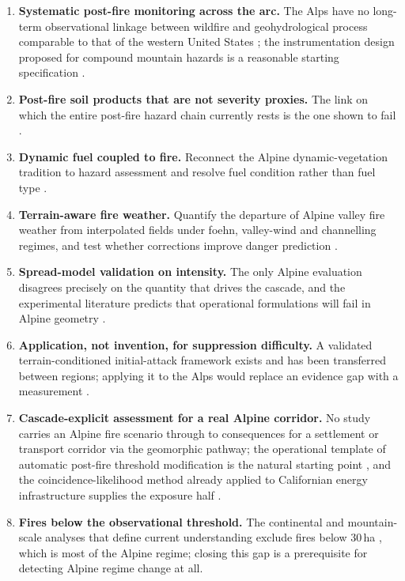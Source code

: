 \documentclass[11pt,a4paper]{article}
\begin{document}
\begin{enumerate}
    \item \textbf{Systematic post-fire monitoring across the arc.} The Alps have no long-term observational linkage between wildfire and geohydrological process comparable to that of the western United States \citep{melzner_wildfire-induced_2025}; the instrumentation design proposed for compound mountain hazards is a reasonable starting specification \citep{baselt_compound_2026}.
    \item \textbf{Post-fire soil products that are not severity proxies.} The link on which the entire post-fire hazard chain currently rests is the one shown to fail \citep{negri_wildfire_2026}.
    \item \textbf{Dynamic fuel coupled to fire.} Reconnect the Alpine dynamic-vegetation tradition to hazard assessment and resolve fuel condition rather than fuel type \citep{schumacher_relative_2006, hillebrand_contrasting_2023, muller_towards_2020}.
    \item \textbf{Terrain-aware fire weather.} Quantify the departure of Alpine valley fire weather from interpolated fields under foehn, valley-wind and channelling regimes, and test whether corrections improve danger prediction \citep{ozaki_impact_2022, sharples_overview_2009}.
    \item \textbf{Spread-model validation on intensity.} The only Alpine evaluation disagrees precisely on the quantity that drives the cascade, and the experimental literature predicts that operational formulations will fail in Alpine geometry \citep{malanchini_modeling_2025, hayajneh_wind_2026}.
    \item \textbf{Application, not invention, for suppression difficulty.} A validated terrain-conditioned initial-attack framework exists and has been transferred between regions; applying it to the Alps would replace an evidence gap with a measurement \citep{cardil_assessing_2025}.
    \item \textbf{Cascade-explicit assessment for a real Alpine corridor.} No study carries an Alpine fire scenario through to consequences for a settlement or transport corridor via the geomorphic pathway; the operational template of automatic post-fire threshold modification is the natural starting point \citep{tiranti_wildfires_2021}, and the coincidence-likelihood method already applied to Californian energy infrastructure supplies the exposure half \citep{moftakhari_increasing_2019}.
    \item \textbf{Fires below the observational threshold.} The continental and mountain-scale analyses that define current understanding exclude fires below 30\,ha \citep{beloiu_climatedriven_2026}, which is most of the Alpine regime; closing this gap is a prerequisite for detecting Alpine regime change at all.

\end{enumerate}
\end{document}
